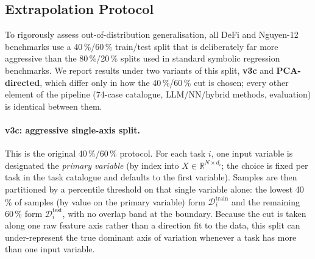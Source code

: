 \documentclass[twoside,11pt]{article}
\begin{document}
\subsection{Extrapolation Protocol}\label{subsec:extrapolation-protocol}
\label{sec:split}

To rigorously assess out-of-distribution generalisation, all DeFi and
Nguyen-12 benchmarks use a 40\,\%/60\,\% train/test split that is
deliberately far more aggressive than the 80\,\%/20\,\% splits used in
standard symbolic regression benchmarks. We report results under two
variants of this split, \textbf{v3c} and \textbf{PCA-directed}, which
differ only in how the 40\,\%/60\,\% cut is chosen; every other element of
the pipeline (74-case catalogue, LLM/NN/hybrid methods, evaluation) is
identical between them.

\paragraph{v3c: aggressive single-axis split.}
This is the original 40\,\%/60\,\% protocol. For each task $i$, one input
variable is designated the \emph{primary variable} (by index into
$X \in \mathbb{R}^{N \times d_i}$; the choice is fixed per task in the task
catalogue and defaults to the first variable). Samples are then partitioned
by a percentile threshold on that single variable alone: the lowest 40\,\%
of samples (by value on the primary variable) form
$\mathcal{D}^{\mathrm{train}}_i$ and the remaining 60\,\% form
$\mathcal{D}^{\mathrm{test}}_i$, with no overlap band at the boundary. Because
the cut is taken along one raw feature axis rather than a direction fit to
the data, this split can under-represent the true dominant axis of variation
whenever a task has more than one input variable.
\end{document}
